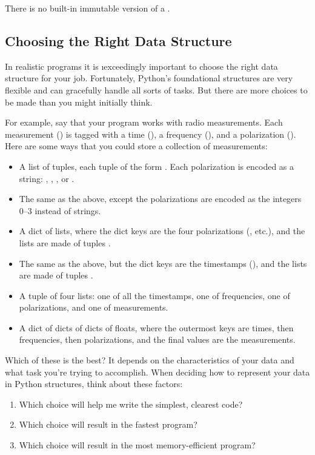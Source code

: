 \documentclass[letterpaper, 12pt, titlepage, twoside]{article}
\begin{document}
There is no built-in immutable version of a .

\subsection*{Choosing the Right Data Structure}

In realistic programs it is \i{exceedingly} important to choose the right data
structure for your job. Fortunately, Python's foundational structures are very
flexible and can gracefully handle all sorts of tasks. But there are more
choices to be made than you might initially think.

For example, say that your program works with radio measurements. Each
measurement () is tagged with a time (), a frequency (), and a
polarization (). Here are some ways that you could store a collection of
measurements:

\begin{itemize}
\item A list of tuples, each tuple of the form . Each
  polarization is encoded as a string: , , , or
  .
\item The same as the above, except the polarizations are encoded as the
  integers 0--3 instead of strings.
\item A dict of lists, where the dict keys are the four polarizations
  (, etc.), and the lists are made of tuples .
\item The same as the above, but the dict keys are the timestamps
  (), and the lists are made of tuples .
\item A tuple of four lists: one of all the timestamps, one of frequencies,
  one of polarizations, and one of measurements.
\item A dict of dicts of dicts of floats, where the outermost keys are times,
  then frequencies, then polarizations, and the final values are the
  measurements.
\end{itemize}

Which of these is the best? It depends on the characteristics of your data and
what task you're trying to accomplish. When deciding how to represent your data in
Python structures, think about these factors:

\begin{enumerate}
\item Which choice will help me write the simplest, clearest code?
\item Which choice will result in the fastest program?
\item Which choice will result in the most memory-efficient program?
\end{enumerate}
\end{document}
